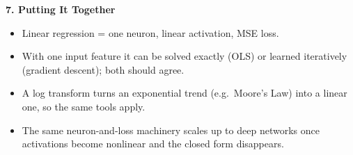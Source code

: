 \documentclass[conference]{IEEEtran}
\begin{document}
\bigskip

\textbf{7. Putting It Together}

\begin{itemize}
    \item Linear regression = one neuron, linear activation, MSE loss.
    \item With one input feature it can be solved exactly (OLS) or
          learned iteratively (gradient descent); both should agree.
    \item A log transform turns an exponential trend (e.g.\ Moore's Law)
          into a linear one, so the same tools apply.
    \item The same neuron-and-loss machinery scales up to deep networks
          once activations become nonlinear and the closed form
          disappears.
\end{itemize}
\end{document}
